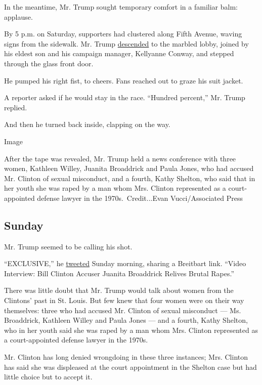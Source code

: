 In the meantime, Mr. Trump sought temporary comfort in a familiar balm:
applause.

By 5 p.m. on Saturday, supporters had clustered along Fifth Avenue,
waving signs from the sidewalk. Mr. Trump
\href{https://www.nytimes.com/2016/10/10/us/politics/trump-tower.html}{descended}
to the marbled lobby, joined by his eldest son and his campaign manager,
Kellyanne Conway, and stepped through the glass front door.

He pumped his right fist, to cheers. Fans reached out to graze his suit
jacket.

A reporter asked if he would stay in the race. ``Hundred percent,'' Mr.
Trump replied.

And then he turned back inside, clapping on the way.

Image

After the tape was revealed, Mr. Trump held a news conference with three
women, Kathleen Willey, Juanita Broaddrick and Paula Jones, who had
accused Mr. Clinton of sexual misconduct, and a fourth, Kathy Shelton,
who said that in her youth she was raped by a man whom Mrs. Clinton
represented as a court-appointed defense lawyer in the
1970s.~Credit...Evan Vucci/Associated Press

\hypertarget{sunday}{%
\subsection{Sunday}\label{sunday}}

Mr. Trump seemed to be calling his shot.

``EXCLUSIVE,'' he
\href{https://twitter.com/realdonaldtrump/status/785106800572063744?lang=en}{tweeted}
Sunday morning, sharing a Breitbart link. ``Video Interview: Bill
Clinton Accuser Juanita Broaddrick Relives Brutal Rapes.''

There was little doubt that Mr. Trump would talk about women from the
Clintons' past in St. Louis. But few knew that four women were on their
way themselves: three who had accused Mr. Clinton of sexual misconduct
--- Ms. Broaddrick, Kathleen Willey and Paula Jones --- and a fourth,
Kathy Shelton, who in her youth said she was raped by a man whom Mrs.
Clinton represented as a court-appointed defense lawyer in the 1970s.

Mr. Clinton has long denied wrongdoing in these three instances; Mrs.
Clinton has said she was displeased at the court appointment in the
Shelton case but had little choice but to accept it.


